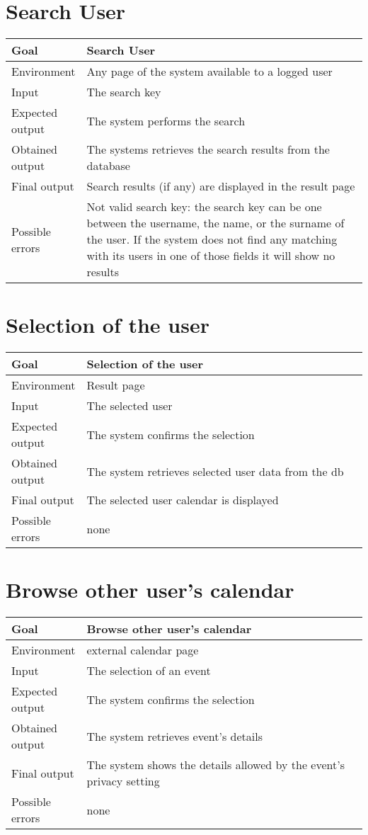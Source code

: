 \documentclass[10pt,a4paper,titlepage]{article}
\begin{document}
\section{Search User}
\begin{tabular}{| p{0.2\linewidth} | p{0.8\linewidth} |}
\hline Goal & Search User \\
\hline Environment & Any page of the system available to a logged user \\
\hline Input & The search key \\
\hline Expected output & The system performs the search \\
\hline Obtained output & The systems retrieves the search results from the database \\
\hline Final output & Search results (if any) are displayed in the result page \\
\hline Possible errors & Not valid search key: the search key can be one between the username,
the name, or the surname of the user. If the system does not find any
matching with its users in one of those fields it will show no results \\
\hline
\end{tabular}


\section{Selection of the user}
\begin{tabular}{| p{0.2\linewidth} | p{0.8\linewidth} |}
\hline Goal & Selection of the user\\
\hline Environment & Result page \\
\hline Input & The selected user \\
\hline Expected output & The system confirms the selection \\
\hline Obtained output & The system retrieves selected user data from the db \\
\hline Final output & The selected user calendar is displayed \\
\hline Possible errors & none \\
\hline
\end{tabular}


\section{Browse other user's calendar}
\begin{tabular}{| p{0.2\linewidth} | p{0.8\linewidth} |}
\hline Goal & Browse other user’s calendar\\
\hline Environment & external calendar page \\
\hline Input & The selection of an event \\
\hline Expected output & The system confirms the selection \\
\hline Obtained output & The system retrieves event’s details \\
\hline Final output & The system shows the details allowed by the event’s privacy setting \\
\hline Possible errors & none \\
\hline
\end{tabular}
\end{document}
